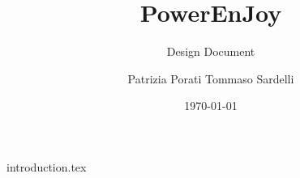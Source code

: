 \documentclass{beamer}
\author{Patrizia Porati \newline Tommaso Sardelli}
\title{PowerEnJoy}
\subtitle{Design Document}
\institute{Politecnico di Milano}
\date{\today}
\begin{document}
{introduction.tex}




\end{document}
